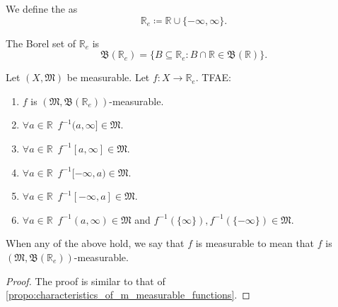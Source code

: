\documentclass[notoc,notitlepage]{tufte-book}
\begin{document}
\begin{defn}\label{defn:extended_reals}
  We define the  as
  \begin{equation*}
    \mathbb{R}_e \coloneqq \mathbb{R} \cup \{ - \infty, \infty \}.
  \end{equation*}
\end{defn}

\begin{note}
  The Borel set of $\mathbb{R}_e$ is
  \begin{equation*}
    \mathfrak{B}(\mathbb{R}_e) = \{ B \subseteq \mathbb{R}_e
              : B \cap \mathbb{R} \in \mathfrak{B}(\mathbb{R}) \}.
  \end{equation*}
\end{note}

\begin{propo}\label{propo:characteristics_of_mathfrak_m_mathfrak_b_mathbb_r__e_measurable_functions}
  Let $(X, \mathfrak{M})$ be measurable.
  Let $f : X \to \mathbb{R}_e$. TFAE:
  \begin{enumerate}
    \item $f$ is $(\mathfrak{M}, \mathfrak{B}(\mathbb{R}_e))$-measurable.
    \item $\forall a \in \mathbb{R}\enspace f^{-1}(a, \infty] \in \mathfrak{M}$.
    \item $\forall a \in \mathbb{R}\enspace f^{-1}[a, \infty] \in \mathfrak{M}$.
    \item $\forall a \in \mathbb{R}\enspace f^{-1}[-\infty, a) \in \mathfrak{M}$.
    \item $\forall a \in \mathbb{R}\enspace f^{-1}[-\infty, a] \in \mathfrak{M}$.
    \item $\forall a \in \mathbb{R}\enspace f^{-1}(a, \infty) \in \mathfrak{M}$
      and $f^{-1}(\{\infty\}), f^{-1}(\{-\infty\}) \in \mathfrak{M}$.
  \end{enumerate}
  When any of the above hold, we say that $f$ is measurable
  to mean that $f$ is $(\mathfrak{M}, \mathfrak{B}(\mathbb{R}_e))$-measurable.
\end{propo}

\begin{proof}
  The proof is similar to that of
  \cref{propo:characteristics_of_m_measurable_functions}.
\end{proof}
\end{document}
